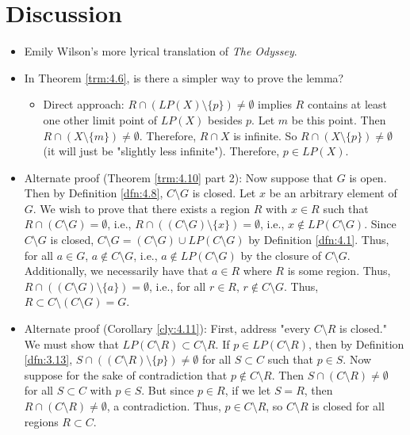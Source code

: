 \documentclass[titlepage]{report}
\begin{document}
\section{Discussion}
\begin{itemize}
    \item {}Emily Wilson's more lyrical translation of \emph{The Odyssey}.
    \item {}In Theorem \ref{trm:4.6}, is there a simpler way to prove the lemma?
    \begin{itemize}
        \item Direct approach: $R\cap(LP(X)\setminus\{p\})\neq\emptyset$ implies $R$ contains at least one other limit point of $LP(X)$ besides $p$. Let $m$ be this point. Then $R\cap(X\setminus\{m\})\neq\emptyset$. Therefore, $R\cap X$ is infinite. So $R\cap(X\setminus\{p\})\neq\emptyset$ (it will just be "slightly less infinite"). Therefore, $p\in LP(X)$.
    \end{itemize}
    \item Alternate proof (Theorem \ref{trm:4.10} part 2): Now suppose that $G$ is open. Then by Definition \ref{dfn:4.8}, $C\setminus G$ is closed. Let $x$ be an arbitrary element of $G$. We wish to prove that there exists a region $R$ with $x\in R$ such that $R\cap(C\setminus G)=\emptyset$, i.e., $R\cap((C\setminus G)\setminus\{x\})=\emptyset$, i.e., $x\notin LP(C\setminus G)$. Since $C\setminus G$ is closed, $C\setminus G=(C\setminus G)\cup LP(C\setminus G)$ by Definition \ref{dfn:4.1}. Thus, for all $a\in G$, $a\notin C\setminus G$, i.e., $a\notin LP(C\setminus G)$ by the closure of $C\setminus G$. Additionally, we necessarily have that $a\in R$ where $R$ is some region. Thus, $R\cap((C\setminus G)\setminus\{a\})=\emptyset$, i.e., for all $r\in R$, $r\notin C\setminus G$. Thus, $R\subset C\setminus(C\setminus G)=G$.
    \item Alternate proof (Corollary \ref{cly:4.11}): First, address "every $C\setminus R$ is closed." We must show that $LP(C\setminus R)\subset C\setminus R$. If $p\in LP(C\setminus R)$, then by Definition \ref{dfn:3.13}, $S\cap((C\setminus R)\setminus\{p\})\neq\emptyset$ for all $S\subset C$ such that $p\in S$. Now suppose for the sake of contradiction that $p\notin C\setminus R$. Then $S\cap(C\setminus R)\neq\emptyset$ for all $S\subset C$ with $p\in S$. But since $p\in R$, if we let $S=R$, then $R\cap(C\setminus R)\neq\emptyset$, a contradiction. Thus, $p\in C\setminus R$, so $C\setminus R$ is closed for all regions $R\subset C$.\par

\end{itemize}
\end{document}
